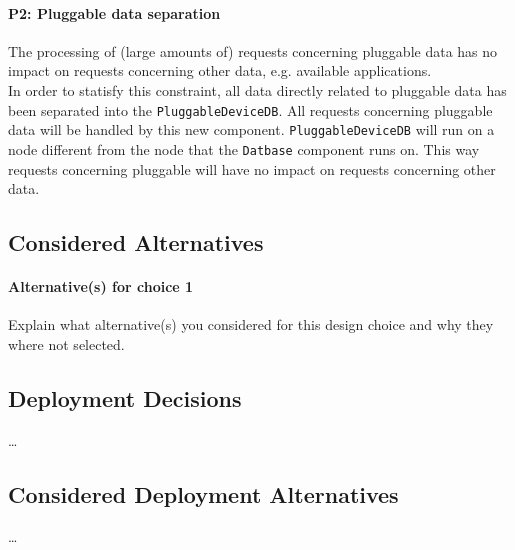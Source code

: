         \paragraph{P2: Pluggable data separation}
            The processing of (large amounts of) requests concerning pluggable
            data has no impact on requests concerning other data, e.g. available applications. \\
            In order to statisfy this constraint, all data directly related to
            pluggable data has been separated into the \texttt{PluggableDeviceDB}.
            All requests concerning pluggable data will be handled by this new
            component. \texttt{PluggableDeviceDB} will run on a node different
            from the node that the \texttt{Datbase} component runs on. This way
            requests concerning pluggable will have no impact on
            requests concerning other data.

    \subsection*{Considered Alternatives}
        \paragraph{Alternative(s) for choice 1} Explain what alternative(s) you
        considered for this design choice and why they where not selected.

    \subsection*{Deployment Decisions}
        \ldots

    \subsection*{Considered Deployment Alternatives}
        \ldots
